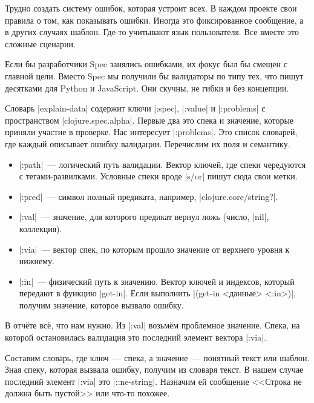 Трудно создать систему ошибок, которая устроит всех. В каждом проекте свои
правила о том, как показывать ошибки. Иногда это фиксированное сообщение, а в
других случаях шаблон. Где-то учитывают язык пользователя. Все вместе это
сложные сценарии.

Если бы разработчики Spec занялись ошибками, их фокус был бы смещен с главной
цели. Вместо Spec мы получили бы валидаторы по типу тех, что пишут десятками для
Python и JavaScript. Они скучны, не гибки и без концепции.

Словарь \spverb|explain-data| содержит ключи \spverb|:spec|, \spverb|:value| и
\spverb|:problems| с пространством \spverb|clojure.spec.alpha|. Первые два это
спека и значение, которые приняли участие в проверке. Нас интересует
\spverb|:problems|. Это список словарей, где каждый описывает ошибку
валидации. Перечислим их поля и семантику.


\begin{itemize}

\item
  \spverb|:path|~--- логический путь валидации. Вектор ключей, где спеки
  чередуются с тегами-развилками. Условные спеки вроде \spverb|s/or| пишут сюда
  свои метки.

\item
  \spverb|:pred|~--- символ полный предиката, например,
  \spverb|clojure.core/string?|.

\item
  \spverb|:val|~--- значение, для которого предикат вернул ложь (число,
  \spverb|nil|, коллекция).

\item
  \spverb|:via|~--- вектор спек, по которым прошло значение от верхнего уровня к
  нижнему.

\item
  \spverb|:in|~--- физический путь к значению. Вектор ключей и индексов, который
  передают в функцию \spverb|get-in|. Если выполнить \spverb|(get-in <данные> <:in>)|,
  получим значение, которое вызвало ошибку.

\end{itemize}

В отч\"{е}те вс\"{е}, что нам нужно. Из \spverb|:val| возьм\"{е}м проблемное
значение. Спека, на которой остановилась валидация это последний элемент вектора
\spverb|:via|.

Составим словарь, где ключ~--- спека, а значение~--- понятный текст или
шаблон. Зная спеку, которая вызвала ошибку, получим из словаря текст. В нашем
случае последний элемент \spverb|:via| это \spverb|::ne-string|. Назначим ей
сообщение <<Строка не должна быть пустой>> или что-то похожее.

